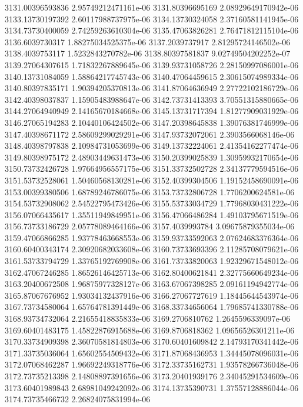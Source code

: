 {3131.00396593836 2.95749212471161e-06
3131.80396695169 2.08929649170942e-06
3133.13730197392 2.60117988737975e-06
3134.13730324058 2.37160581141945e-06
3134.73730400059 2.74259263610304e-06
3135.47063826281 2.76471812115104e-06
3136.6039730317 1.88275034525375e-06
3137.2039737917 2.81295724146502e-06
3138.4039753117 1.5232843270782e-06
3138.80397581837 9.02749504202252e-07
3139.27064307615 1.71832267889645e-06
3139.93731058726 2.28150997086001e-06
3140.13731084059 1.58864217745743e-06
3140.47064459615 2.30615074989334e-06
3140.80397835171 1.90394205370813e-06
3141.87064636949 2.27722102186729e-06
3142.40398037837 1.15905483988647e-06
3142.73731413393 3.70551315880665e-06
3144.27064940949 2.14165670184668e-06
3145.13731717394 1.81277909031929e-06
3146.27065194283 2.10440106424502e-06
3147.20398645838 1.39076381746999e-06
3147.40398671172 2.58609299029291e-06
3147.93732072061 2.3903566068146e-06
3148.40398797838 2.10984731053699e-06
3149.13732224061 2.41354162277474e-06
3149.80398975172 2.48903449631473e-06
3150.20399025839 1.30959932170654e-06
3150.73732426728 1.97664956557175e-06
3151.33732502728 2.34137779594516e-06
3151.53732528061 1.50460568130281e-06
3152.40399304506 1.19152458690091e-06
3153.00399380506 1.68789246786075e-06
3153.73732806728 1.7706200624581e-06
3154.53732908062 2.54522795473426e-06
3155.53733034729 1.77968030431222e-06
3156.07066435617 1.35511949849951e-06
3156.47066486284 1.49103795671519e-06
3156.73733186729 2.05778089464166e-06
3157.4039993784 3.09675879355034e-06
3159.47066866285 1.93778463668553e-06
3159.93733592063 2.07624683376364e-06
3160.60400343174 2.30920682033608e-06
3160.73733693396 2.11285708079621e-06
3161.53733794729 1.33765192769908e-06
3161.73733820063 1.92329671548012e-06
3162.47067246285 1.86526146425713e-06
3162.80400621841 2.32775660649234e-06
3163.20400672508 1.96875977328127e-06
3163.67067398285 2.09161194942774e-06
3165.87067676952 1.93034132437916e-06
3166.27067727619 1.18445644543974e-06
3167.73734580064 1.65764781391449e-06
3168.33734656064 1.79685741330788e-06
3168.93734732064 2.21655418835833e-06
3169.2706810762 1.2645596339097e-06
3169.60401483175 1.45822876915688e-06
3169.8706818362 1.09656526301211e-06
3170.33734909398 2.36070581814803e-06
3170.60401609842 2.14793170341442e-06
3171.33735036064 1.65602554509432e-06
3171.87068436953 1.34445078096031e-06
3172.07068462287 1.96692249318776e-06
3172.33735162731 1.93578266736048e-06
3172.73735213398 2.14808897391656e-06
3173.20401939176 2.34045291534609e-06
3173.60401989843 2.68981049242092e-06
3174.13735390731 1.37557128886044e-06
3174.73735466732 2.26824075831994e-06
}

